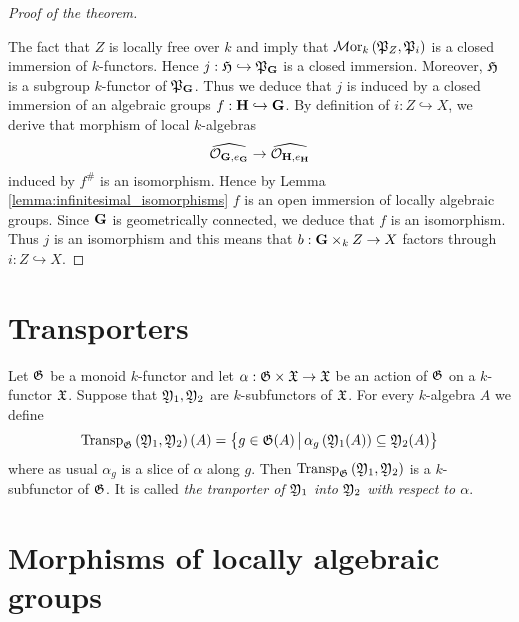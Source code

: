 \begin{proof}[Proof of the theorem]
\begin{center}
\end{center}
The fact that $Z$ is locally free over $k$ and {\cite[Theorem 6.2]{kfunctors}} imply that $\mathcal{M}\mathrm{or}_k\left({\mathfrak P}_{Z},{\mathfrak P}_{i}\right)$ is a closed immersion of $k$-functors. Hence $j:{\mathfrak H} \hookrightarrow {\mathfrak P}_{\mathbf{G}}$ is a closed immersion. Moreover, ${\mathfrak H}$ is a subgroup $k$-functor of ${\mathfrak P}_{\mathbf{G}}$. Thus we deduce that $j$ is induced by a closed immersion of an algebraic groups $f:\mathbf{H} \hookrightarrow \mathbf{G}$. By definition of $i:Z\hookrightarrow X$, we derive that morphism of local $k$-algebras
$$\widehat{{\mathcal O}_{\mathbf{G},e_{\mathbf{G}}}} \rightarrow  \widehat{{\mathcal O}_{\mathbf{H},e_{\mathbf{H}}}}$$
induced by $f^{\#}$ is an isomorphism. Hence by Lemma \ref{lemma:infinitesimal_isomorphisms} $f$ is an open immersion of locally algebraic groups. Since $\mathbf{G}$ is geometrically connected, we deduce that $f$ is an isomorphism. Thus $j$ is an isomorphism and this means that $b:\mathbf{G}\times_k Z\rightarrow X$ factors through $i:Z\hookrightarrow X$.
\end{proof}

\section{Transporters}

\begin{definition}
Let ${\mathfrak G}$ be a monoid $k$-functor and let $\alpha:{\mathfrak G}\times {\mathfrak X}\rightarrow {\mathfrak X}$ be an action of ${\mathfrak G}$ on a $k$-functor ${\mathfrak X}$. Suppose that ${\mathfrak Y}_1,{\mathfrak Y}_2$ are $k$-subfunctors of ${\mathfrak X}$. For every $k$-algebra $A$ we define
$$\mathrm{Transp}_{{\mathfrak G}}\left({\mathfrak Y}_1,{\mathfrak Y}_2\right)(A) = \big\{g\in {\mathfrak G}(A)\,\big|\,\alpha_g\left({\mathfrak Y}_1(A)\right)\subseteq {\mathfrak Y}_2(A)\big\}$$
where as usual $\alpha_g$ is a slice of $\alpha$ along $g$. Then $\mathrm{Transp}_{{\mathfrak G}}\left({\mathfrak Y}_1,{\mathfrak Y}_2\right)$ is a $k$-subfunctor of ${\mathfrak G}$. It is called \textit{the tranporter of ${\mathfrak Y}_1$ into ${\mathfrak Y}_2$ with respect to $\alpha$}. 
\end{definition}

\section{Morphisms of locally algebraic groups}

